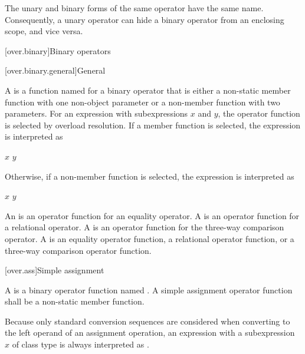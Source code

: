 \pnum
\begin{note}
The unary and binary forms of the same operator have the same name.
Consequently, a unary operator can hide a binary
operator from an enclosing scope, and vice versa.
\end{note}

[over.binary]{Binary operators}%

[over.binary.general]{General}%
%

\pnum
A 
is a function named 
for a binary operator  that is either
a non-static member function with one non-object parameter or
a non-member function with two parameters.
%
For an expression  with subexpressions $x$ and $y$,
the operator function is selected by overload resolution.
If a member function is selected,
the expression is interpreted as
\begin{ncsimplebnf}
$x$    \terminal{(} $y$ \terminal{)}
\end{ncsimplebnf}
Otherwise, if a non-member function is selected,
the expression is interpreted as
\begin{ncsimplebnf}
  \terminal{(} $x$ \terminal{,} $y$ \terminal{)}
\end{ncsimplebnf}

\pnum
An  is an operator function
for an equality operator.
A  is an operator function
for a relational operator.
A  is an operator function
for the three-way comparison operator.
A  is
an equality operator function,
a relational operator function, or
a three-way comparison operator function.

[over.ass]{Simple assignment}
%

\pnum
A 
is a binary operator function named .
A simple assignment operator function shall be a non-static member function.
\begin{note}
Because only standard conversion sequences are considered when converting
to the left operand of an assignment operation,
an expression  with a subexpression $x$ of class type
is always interpreted as .
\end{note}

